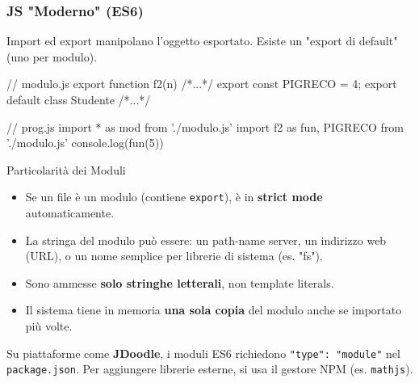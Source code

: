 \subsubsection{JS "Moderno" (ES6)}
Import ed export manipolano l'oggetto esportato. Esiste un "export di default" (uno per modulo).

\begin{jsbox}[title={Implementazione Import/Export}]
// modulo.js
export function f2(n) { /*...*/ }
export const PIGRECO = 4;
export default class Studente { /*...*/ }

// prog.js
import * as mod from './modulo.js'
import { f2 as fun, PIGRECO } from './modulo.js'
console.log(fun(5))
\end{jsbox}

\begin{definition}{Particolarità dei Moduli}
\begin{itemize}
    \item Se un file è un modulo (contiene \texttt{export}), è in \textbf{strict mode} automaticamente.
    \item La stringa del modulo può essere: un path-name server, un indirizzo web (URL), o un nome semplice per librerie di sistema (es. "fs").
    \item Sono ammesse \textbf{solo stringhe letterali}, non template literals.
    \item Il sistema tiene in memoria \textbf{una sola copia} del modulo anche se importato più volte.
\end{itemize}
\end{definition}

Su piattaforme come \textbf{JDoodle}, i moduli ES6 richiedono \texttt{"type": "module"} nel \texttt{package.json}. Per aggiungere librerie esterne, si usa il gestore NPM (es. \texttt{mathjs}).
